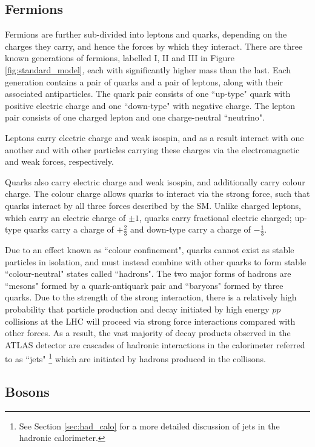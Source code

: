 \subsection{Fermions}

Fermions are further sub-divided into leptons and quarks, depending on the charges they carry, and hence the forces by which they interact. There are three known generations of fermions, labelled I, II and III in Figure \ref{fig:standard_model}, each with significantly higher mass than the last. Each generation contains a pair of quarks and a pair of leptons, along with their associated antiparticles. The quark pair consists of one ``up-type" quark with positive electric charge and one ``down-type" with negative charge. The lepton pair consists of one charged lepton and one charge-neutral ``neutrino". 

Leptons carry electric charge and weak isospin, and as a result interact with one another and with other particles carrying these charges via the electromagnetic and weak forces, respectively.  

Quarks also carry electric charge and weak isospin, and additionally carry colour charge. The colour charge allows quarks to interact via the strong force, such that quarks interact by all three forces described by the SM. Unlike charged leptons, which carry an electric charge of \(\pm1\), quarks carry fractional electric charged; up-type quarks carry a charge of \(+\frac{2}{3}\) and down-type carry a charge of \(-\frac{1}{3}\).

Due to an effect known as ``colour confinement", quarks cannot exist as stable particles in isolation, and must instead combine with other quarks to form stable ``colour-neutral" states called ``hadrons". The two major forms of hadrons are ``mesons" formed by a quark-antiquark pair and ``baryons" formed by three quarks. Due to the strength of the strong interaction, there is a relatively high probability that particle production and decay initiated by high energy $pp$ collisions at the LHC will proceed via strong force interactions compared with other forces. As a result, the vast majority of decay products observed in the ATLAS detector are cascades of hadronic interactions in the calorimeter referred to as ``jets" \footnote{See Section \ref{sec:had_calo} for a more detailed discussion of jets in the hadronic calorimeter.} which are initiated by hadrons produced in the collisons.

\subsection{Bosons}


